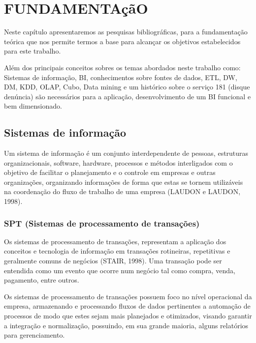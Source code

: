 %
%

\chapter{FUNDAMENTA\c{c}\~{a}O}\label{chap:fundamentacao}

Neste capítulo apresentaremos as pesquisas bibliográficas, para a fundamentação teórica que nos permite termos a base para alcan\c{c}ar os objetivos estabelecidos para este trabalho.

Al\'{e}m dos principais conceitos sobres os temas abordados neste trabalho como: Sistemas de informa\c{c}\~{a}o, BI, conhecimentos sobre fontes de dados, ETL, DW, DM, KDD, OLAP, Cubo, Data mining e um histórico sobre o servi\c{c}o 181 (disque denúncia) s\~{a}o necess\'{a}rios para a aplica\c{c}\~{a}o, desenvolvimento de um BI funcional e bem dimensionado.

\section{Sistemas de informa\c{c}\~{a}o}

Um sistema de informação é um conjunto interdependente de pessoas, estruturas organizacionais, software, hardware, processos e métodos interligados com o objetivo de facilitar o planejamento e o controle em empresas e outras organizações, organizando informações de forma que estas se tornem utilizáveis na coordenação do fluxo de trabalho de uma empresa (LAUDON e LAUDON, 1998).

\subsection{SPT (Sistemas de processamento de transações)}

Os sistemas de processamento de transações, representam a aplicação dos conceitos e tecnologia de informação em transações rotineiras, repetitivas e geralmente comuns de negócios (STAIR, 1998). Uma transação pode ser entendida como um evento que ocorre num negócio tal como compra, venda, pagamento, entre outros.

Os sistemas de processamento de transações possuem foco no nível operacional da empresa, armazenando e processando fluxos de dados pertinentes a automação de processos de modo que estes sejam mais planejados e otimizados, visando garantir a integração e normalização, possuindo, em sua grande maioria, alguns relatórios para gerenciamento.

